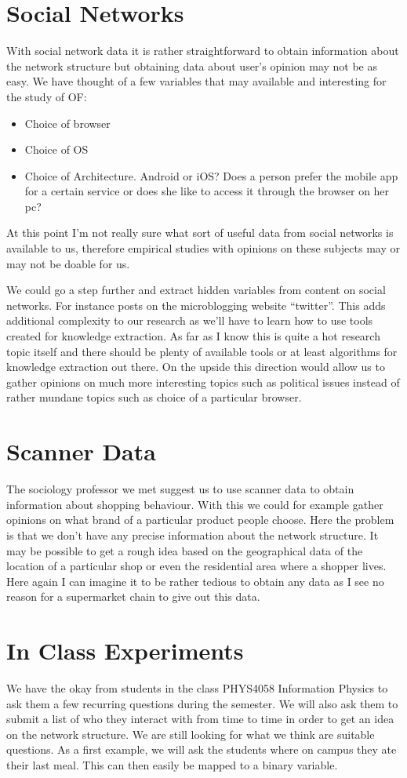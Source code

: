 \documentclass[a4paper]{scrartcl}
\begin{document}
\section{Social Networks}
With social network data it is rather straightforward to obtain information about the network structure but obtaining data about user's opinion may not be as easy.
We have thought of a few variables that may available and interesting for the study of OF:
\begin{itemize}
\item Choice of browser
\item Choice of OS
\item Choice of Architecture. Android or iOS? Does a person prefer the mobile app for a certain service or does she like to access it through the browser on her pc?
\end{itemize}
At this point I'm not really sure what sort of useful data from social networks
is available to us, therefore empirical studies with opinions on these subjects
may or may not be doable for us.

We could go a step further and extract hidden variables from content on social
networks. For instance posts on the microblogging website ``twitter''. This
adds additional complexity to our research as we'll have to learn how to use
tools created for knowledge extraction. As far as I know this is quite a hot
research topic itself and there should be plenty of available tools or at least
algorithms for knowledge extraction out there. On the upside this direction
would allow us to gather opinions on much more interesting topics such as
political issues instead of rather mundane topics such as choice of a
particular browser.

\section{Scanner Data}
The sociology professor we met suggest us to use scanner data to obtain
information about shopping behaviour. With this we could for example gather
opinions on what brand of a particular product people choose. Here the problem
is that we don't have any precise information about the network structure. It
may be possible to get a rough idea based on the geographical data of the
location of a particular shop or even the residential area where a shopper
lives. Here again I can imagine it to be rather tedious to obtain any data as I
see no reason for a supermarket chain to give out this data.

\section{In Class Experiments}
We have the okay from students in the class PHYS4058 Information Physics to ask them a few recurring questions during the semester.
We will also ask them to submit a list of who they interact with from time to time in order to get an idea on the network structure.
We are still looking for what we think are suitable questions.
As a first example, we will ask the students where on campus they ate their last meal.
This can then easily be mapped to a binary variable.
\end{document}
